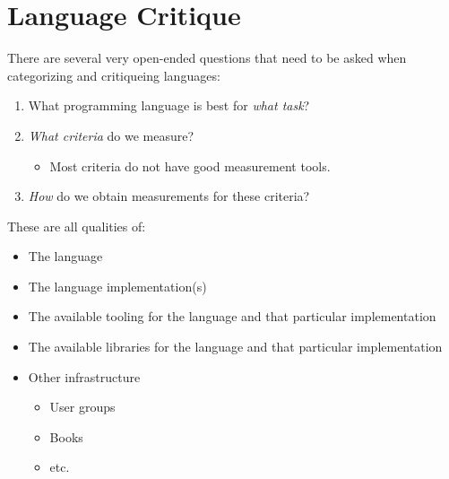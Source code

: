 \section{Language Critique}\label{sec:Language_Critique}
There are several very open-ended questions that need to be asked when categorizing and critiqueing languages:
\begin{enumerate}[noitemsep]
\item What programming language is best for \emph{what task}?
\item \emph{What criteria} do we measure?
  \begin{itemize}[noitemsep]
  \item Most criteria do not have good measurement tools.
  \end{itemize}

\item \emph{How} do we obtain measurements for these criteria?
\end{enumerate}

These are all qualities of:
\begin{itemize}[noitemsep]
\item The language
\item The language implementation(s)
\item The available tooling for the language and that particular implementation
\item The available libraries for the language and that particular implementation
\item Other infrastructure
  \begin{itemize}[noitemsep]
  \item User groups
  \item Books
  \item etc.
  \end{itemize}
\end{itemize}

